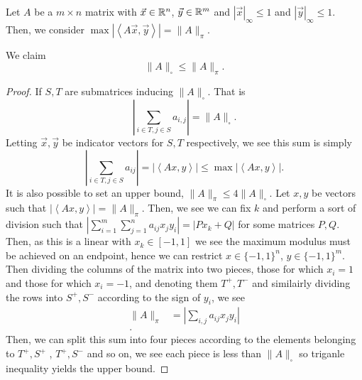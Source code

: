 Let \(A\) be a \(m\times n\) matrix with \(\vec{x} \in \mathbb{R}^{n}\), \(\vec{y} \in \mathbb{R}^{m}\) and \(\left| \vec{x} \right| _{\infty}\le 1\) and \(\left| \vec{y} \right|_{\infty} \le 1 \). Then, we consider \(\max \left| \left<  A\vec{x}, \vec{y} \right>  \right| = \|A\|_{\pi} \).
\begin{proposition}
We claim \[
\| A \|_{\square} \le \|A\|_{\pi}
.\]
\end{proposition}
\begin{proof}
	If \(S, T\) are submatrices inducing \(\| A \|_{\square} \). That is  \[
	\left| \sum_{i \in T, j \in S}a_{i,j}  \right| = \| A \|_{\square}
	.\]
Letting \(\vec{x}, \vec{y}\) be indicator vectors for \(S, T\) respectively, we see this sum is simply \[
\left| \sum_{i \in T, j \in S} a_{ij}\right| = \left| \left<Ax, y \right>  \right|  \le \max \left| \left<Ax, y \right>  \right|
.\]
It is also possible to set an upper bound, \(\|A\|_{\pi} \le 4 \| A \|_{\square} \).
Let \(x, y\) be vectors such that \(\left| \left<Ax, y \right>  \right| = \|A\|_{\pi}\). Then, we see we can fix \(k\) and  perform a sort of division such that \(\left| \sum_{i= 1}^{m} \sum_{j=1}^{n} a_{ij}x_{j}y_{i} \right| = \left| Px_{k} + Q  \right|  \) for some matrices \(P, Q\). Then, as this is a linear with \(x_{k} \in \left[ -1, 1 \right] \) we see the maximum modulus must be achieved on an endpoint, hence we can restrict \(x \in \{-1, 1\} ^{n}\), \(y \in \{-1, 1\} ^{m}\).\\
Then dividing the columns of the matrix into two pieces, those for which \(x_{i} = 1\) and those for which \(x_{i} = -1\), and denoting them \(T^{+}, T^{-}\) and similairly dividing the rows into \(S^{+}, S^{-}\) according to the sign of \(y_{i}\), we see
\begin{align*}
	\|A\|_{\pi}&= \left| \sum_{i, j}^{}a_{ij}x_{j}y_{i} \right| \\
.\end{align*}
Then, we can split this sum into four pieces according to the elements belonging to \(T^{+}, S^{+}\) , \(T^{+}, S^{-}\) and so on, we see each piece is less than \(\| A \|_{\square} \) so triganle inequality yields the upper bound.
\end{proof}
